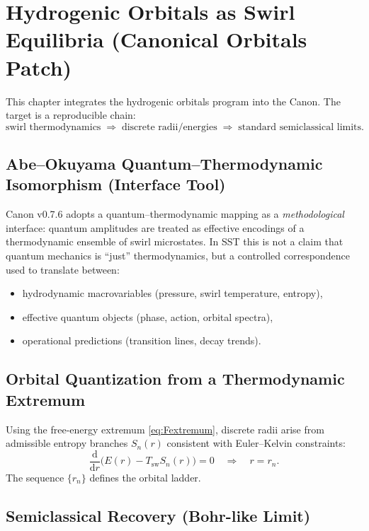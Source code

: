 \documentclass[10pt]{article}
\begin{document}
    \section{Hydrogenic Orbitals as Swirl Equilibria (Canonical Orbitals Patch)}
    \label{sec:hydrogenic_orbitals}

This chapter integrates the hydrogenic orbitals program into the Canon. The
target is a reproducible chain:
\[
\text{swirl thermodynamics} \;\Rightarrow\; \text{discrete radii/energies}
\;\Rightarrow\; \text{standard semiclassical limits}.
\]

\subsection{Abe--Okuyama Quantum--Thermodynamic Isomorphism (Interface Tool)}

Canon v0.7.6 adopts a quantum--thermodynamic mapping as a \emph{methodological}
interface: quantum amplitudes are treated as effective encodings of a
thermodynamic ensemble of swirl microstates. In SST this is not a claim that
quantum mechanics is ``just'' thermodynamics, but a controlled correspondence
used to translate between:
\begin{itemize}
    \item hydrodynamic macrovariables (pressure, swirl temperature, entropy),
    \item effective quantum objects (phase, action, orbital spectra),
    \item operational predictions (transition lines, decay trends).
\end{itemize}

\subsection{Orbital Quantization from a Thermodynamic Extremum}

Using the free-energy extremum \eqref{eq:Fextremum}, discrete radii arise from
admissible entropy branches $S_n(r)$ consistent with Euler--Kelvin constraints:
\begin{equation}
    \frac{\mathrm{d}}{\mathrm{d}r}\Big(E(r)-T_{\mathrm{sw}}S_n(r)\Big)=0
    \quad\Rightarrow\quad r=r_n.
\end{equation}
The sequence $\{r_n\}$ defines the orbital ladder.

\subsection{Semiclassical Recovery (Bohr-like Limit)}
\end{document}
